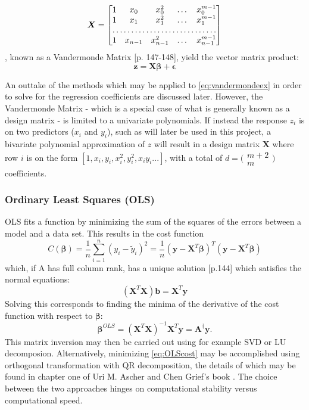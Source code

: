 \documentclass[%
oneside,                 %
final,                   %
10pt]{article}
\begin{document}
\begin{equation}
\bm{X}=\begin{bmatrix}
    1       & x_0 & x_0^2 & \dots & x_0^{m-1} \\
    1       & x_1 & x_1^2 & \dots & x_1^{m-1} \\
    \hdotsfor{5} \\
    1       & x_{n-1} & x_{n-1}^2 & \dots & x_{n-1}^{m-1}
\end{bmatrix}
\end{equation}
, known as a Vandermonde Matrix \citep{Ascher}[p. 147-148], yield the vector matrix product:
\begin{equation}
\bm{z}=\bm{X}\bm{\beta}+\bm{\epsilon}
\label{eq:vandermondeex}
\end{equation}

An outtake of the methods which may be applied to \eqref{eq:vandermondeex} in order to solve for the regression coefficients are discussed later. However, the Vandermonde Matrix - which is a special case of what is generally known as a design matrix - is limited to a univariate polynomials. If instead the response $z_i$ is on two predictors ($x_i$ and $y_i$), such as will later be used in this project, a bivariate polynomial approximation of $z$  will result in a design matrix $\bm{X}$ where row $i$ is on the form $ [1,      x_i , y_i , x_i^2 , y_i^2 ,x_iy_i... ]$, with a total of $d=\bigl(\begin{smallmatrix}
  m+2 \\
  m
\end{smallmatrix}\bigr)$ coefficients.  

\subsubsection{Ordinary Least Squares (OLS)}
OLS fits a function by minimizing the sum of the squares of the errors between a model and a data set. This results in the cost function 
\begin{equation}
C(\bm{\beta})=\frac{1}{n}\sum_{i=1}^n(y_i-\tilde{y}_i)^2=\frac{1}{n}(\bm{y}-\bm{X}^T\bm{\beta})^T(\bm{y}-\bm{X}^T\bm{\beta})
\label{eq:OLScost}
\end{equation}
which, if A has full column rank, has a unique solution \citep{Ascher}[p.144] which satisfies the normal equations:
\begin{equation}
(\bm{X}^T\bm{X})\bm{b}=\bm{X}^T \bm{y}
\label{eq:normeq}
\end{equation}
Solving this corresponds to finding the minima of the derivative of the cost function with respect to $\bm{\beta}$:
\begin{equation}
\bm{\beta}^{OLS}= (\bm{X}^T\bm{X})^{-1}\bm{X}^T \bm{y}=\bm{A}^{\dagger}\bm{y}.
\end{equation}
This matrix inversion may then be carried out using for example SVD or LU decomposion. Alternatively, minimizing \eqref{eq:OLScost} may be accomplished using orthogonal transformation with QR decomposition, the details of which may be found in chapter one of Uri M. Ascher and Chen Grief's book  \cite{Ascher}. The choice between the two approaches hinges on computational stability versus computational speed.
\end{document}
